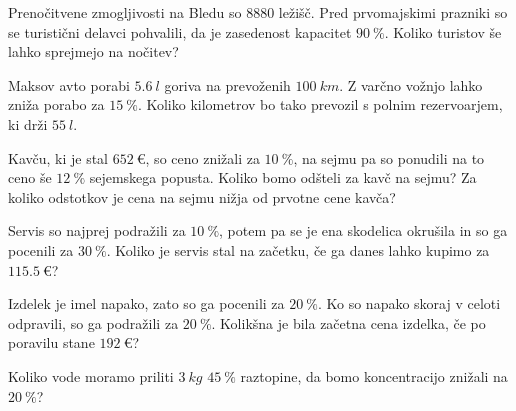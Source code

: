                 \begin{naloga}
                    Prenočitvene zmogljivosti na Bledu so $8880$ ležišč. Pred prvomajskimi prazniki so se turistični delavci pohvalili,
                    da je zasedenost kapacitet $90~\%$. Koliko turistov še lahko sprejmejo na nočitev? 
                \end{naloga}
    
                \begin{naloga}
                    Maksov avto porabi $5.6~l$ goriva na prevoženih $100~km$. 
                    Z varčno vožnjo lahko zniža porabo za $15~\%$.
                    Koliko kilometrov bo tako prevozil s polnim rezervoarjem, ki drži $55~l$. 
                \end{naloga}
            
    
    
            
                \begin{naloga}
                    Kavču, ki je stal $652~€$, so ceno znižali za $10~\%$, na sejmu pa so ponudili na to ceno še $12~\%$ sejemskega popusta.
                    Koliko bomo odšteli za kavč na sejmu? Za koliko odstotkov je cena na sejmu nižja od prvotne cene kavča? 
                \end{naloga}
    
                
                \begin{naloga}
                    Servis so najprej podražili za $10~\%$, potem pa se je ena skodelica okrušila in so ga pocenili za $30~\%$.
                    Koliko je servis stal na začetku, če ga danes lahko kupimo za $115.5~€$? 
                \end{naloga}
    
                \begin{naloga}
                    Izdelek je imel napako, zato so ga pocenili za $20~\%$. Ko so napako skoraj v celoti odpravili, so ga podražili za $20~\%$.
                    Kolikšna je bila začetna cena izdelka, če po poravilu stane $192~€$? 
                \end{naloga}
    
            
    
    
            
                \begin{naloga}
                    Koliko vode moramo priliti $3~kg$ $45~\%$ raztopine, da bomo koncentracijo znižali na $20~\%$? 
                \end{naloga}
    
